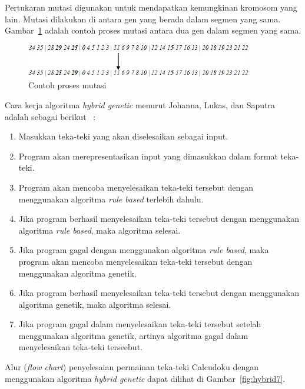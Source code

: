 Pertukaran mutasi digunakan untuk mendapatkan kemungkinan kromosom yang lain. Mutasi dilakukan di antara gen yang berada dalam segmen yang sama. Gambar~\ref{fig:hybrid10} adalah contoh proses mutasi antara dua gen dalam segmen yang sama.

\begin{figure}
\centering
\captionsetup{justification=centering}
\includegraphics[scale=1]{Gambar/HybridGenetic10}
\caption[Contoh proses mutasi ~\cite{johanna:12:hybrid}]{Contoh proses mutasi ~\cite{johanna:12:hybrid}}
\label{fig:hybrid10}
\end{figure}

Cara kerja algoritma \textit{hybrid genetic} menurut Johanna, Lukas, dan Saputra adalah sebagai berikut ~\cite{johanna:12:hybrid}:
\begin{enumerate}
\item Masukkan teka-teki yang akan diselesaikan sebagai input.
\item Program akan merepresentasikan input yang dimasukkan dalam format teka-teki.
\item Program akan mencoba menyelesaikan teka-teki tersebut dengan menggunakan algoritma \textit{rule based} terlebih dahulu.
\item Jika program berhasil menyelesaikan teka-teki tersebut dengan menggunakan algoritma \textit{rule based}, maka algoritma selesai.
\item Jika program gagal dengan menggunakan algoritma \textit{rule based}, maka program akan mencoba menyelesaikan teka-teki tersebut dengan menggunakan algoritma genetik.
\item Jika program berhasil menyelesaikan teka-teki tersebut dengan menggunakan algoritma genetik, maka algoritma selesai.
\item Jika program gagal dalam menyelesaikan teka-teki tersebut setelah menggunakan algoritma genetik, artinya algoritma gagal dalam menyelesaikan teka-teki terseebut.
\end{enumerate}
Alur (\textit{flow chart}) penyelesaian permainan teka-teki Calcudoku dengan menggunakan algoritma \textit{hybrid genetic} dapat dilihat di Gambar~\ref{fig:hybrid7}.

